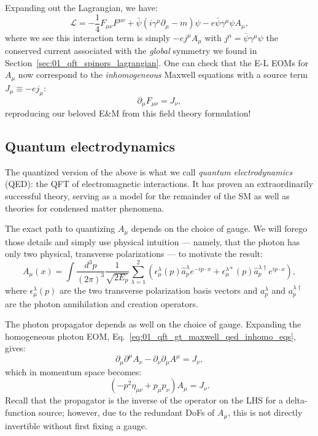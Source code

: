 Expanding out the Lagrangian, we have:
\begin{equation}
	\label{eq:01_qft_gt_maxwell_qed_lagrangian_expanded}
	\mathcal L = -\frac{1}{4}F_{\mu\nu}F^{\mu\nu} + \bar\psi(i\gamma^\mu\partial_\mu - m)\psi - e\bar\psi\gamma^\mu\psi A_\mu,
\end{equation}
where we see this interaction term is simply $-ej^\mu A_\mu$ with $j^\mu = \bar\psi\gamma^\mu\psi$ the conserved current associated with the \textit{global} \UU[1] symmetry we found in Section~\ref{sec:01_qft_spinors_lagrangian}.
One can check that the E-L EOMs for $A_\mu$ now correspond to the \textit{inhomogeneous} Maxwell equations with a source term $J_\mu \equiv -ej_\mu$:
\begin{equation}
	\label{eq:01_qft_gt_maxwell_qed_inhomo_eqs}
	\partial_\mu F_{\mu\nu} = J_\nu,
\end{equation}
reproducing our beloved E\&M from this field theory formulation!

\subsection{Quantum electrodynamics}
\label{sec:01_qft_gt_qed}

The quantized version of the above is what we call \textit{quantum electrodynamics} (QED): the QFT of electromagnetic interactions.
It has proven an extraordinarily successful theory, serving as a model for the remainder of the SM as well as theories for condensed matter phenomena.

The exact path to quantizing $A_\mu$ depends on the choice of gauge.
We will forego those details and simply use physical intuition --- namely, that the photon has only two physical, transverse polarizations --- to motivate the result:
\begin{equation}
	\label{eq:01_qft_gt_maxwell_quantization}
	A_\mu(x) = \int \frac{d^3p}{(2\pi)^3} \frac{1}{\sqrt{2E_p}} \sum_{\lambda=1}^2 \left(\epsilon_\mu^\lambda(p)\hat a^\lambda_p e^{-ip\cdot x} + \epsilon_\mu^{\lambda*}(p) \hat a^{\lambda\dagger}_p e^{ip\cdot x}\right),
\end{equation}
where $\epsilon_\mu^\lambda(p)$ are the two transverse polarization basis vectors and $a_p^\lambda$ and $a^{\lambda\dagger}_p$ are the photon annihilation and creation operators.

The photon propagator depends as well on the choice of gauge.
Expanding the homogeneous photon EOM, Eq.~\ref{eq:01_qft_gt_maxwell_qed_inhomo_eqs}, gives:
\begin{equation}
	\label{eq:01_qft_gt_maxwell_photon_eom_psapce}
	\partial_\mu\partial^\mu A_\nu - \partial_\nu\partial_\mu A^\mu = J_\nu,
\end{equation}
which in momentum space becomes:
\begin{equation}
	\label{eq:01_qft_gt_maxwell_photon_eom_momentum}
	(-p^2 \eta_{\mu\nu} + p_\mu p_\nu) A_\mu  = J_\nu.
\end{equation}
Recall that the propagator is the inverse of the operator on the LHS for a delta-function source; however, due to the redundant DoFs of $A_\mu$, this is not directly invertible without first fixing a gauge.

